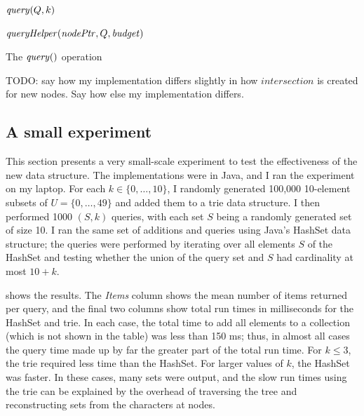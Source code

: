 {
\begin{algorithm}[htb]
 \footnotesize
\DontPrintSemicolon
\nl $\mathit{query}(Q,k)$ \label{queryfunction} \;
\nl {}

\nl $\mathit{queryHelper}(\mathit{nodePtr}, Q,\mathit{budget})$ \label{queryhelperfunction} \;
\nl {}
\caption{The $\mathit{query}()$ operation}
\label{QueryAlgorithm}
\end{algorithm}
}

TODO: say how my implementation differs slightly in how $\mathit{intersection}$
is created for new nodes.  Say how else my implementation differs.

\subsection{A small experiment}

This section presents a very small-scale experiment to test the effectiveness
of the new data structure.
The implementations were in Java, and I ran the experiment on my laptop.
For each $k \in \{0, \dots, 10\}$, I randomly generated
100,000 10-element subsets of $U = \{0, \dots, 49\}$ and added them to a trie
data structure.  I then performed 1000 $(S, k)$ queries, with each set $S$
being a randomly generated set of size 10.  I ran the same set of additions
and queries using Java's HashSet data structure; the queries were performed
by iterating over all elements $S$ of the HashSet and testing whether the union
of the query set and $S$ had cardinality at most $10 + k$.

 shows the results.  The \emph{Items} column shows the
mean number of items returned per query, and the final two columns show total
run times in milliseconds for the HashSet and trie.  In each case, the total
time to add all elements to a collection (which is not shown in the table) was
less than 150 ms; thus, in almost all cases the query time made up by far the
greater part of the total run time.  For $k \leq 3$, the trie required less
time than the HashSet.  For larger values of $k$, the HashSet was faster.  In
these cases, many sets were output, and the slow run times using the trie can
be explained by the overhead of traversing the tree and reconstructing sets
from the characters at nodes.


